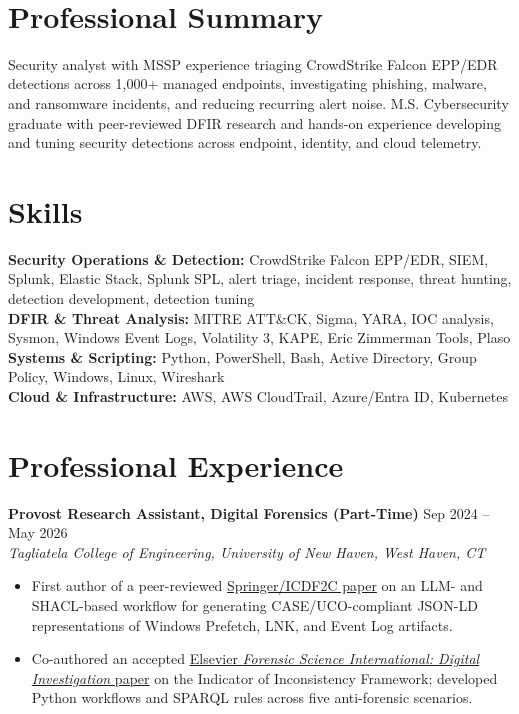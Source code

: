 \documentclass{resume2}
\makeatletter
\renewcommand{\makeheader}{%
  \begin{center}
    {\Large\bfseries \@name}\\[-2pt]
    {\small \@contact}
  \end{center}
}
\makeatother
\begin{document}
\raggedright
\fontsize{10.5pt}{13.2pt}\selectfont
\makeheader

\section{Professional Summary}
Security analyst with MSSP experience triaging CrowdStrike Falcon EPP/EDR detections across 1,000+ managed endpoints, investigating phishing, malware, and ransomware incidents, and reducing recurring alert noise. M.S. Cybersecurity graduate with peer-reviewed DFIR research and hands-on experience developing and tuning security detections across endpoint, identity, and cloud telemetry.

\section{Skills}
\textbf{Security Operations \& Detection:} CrowdStrike Falcon EPP/EDR, SIEM, Splunk, Elastic Stack, Splunk SPL, alert triage, incident response, threat hunting, detection development, detection tuning\\
\textbf{DFIR \& Threat Analysis:} MITRE ATT\&CK, Sigma, YARA, IOC analysis, Sysmon, Windows Event Logs, Volatility 3, KAPE, Eric Zimmerman Tools, Plaso\\
\textbf{Systems \& Scripting:} Python, PowerShell, Bash, Active Directory, Group Policy, Windows, Linux, Wireshark\\
\textbf{Cloud \& Infrastructure:} AWS, AWS CloudTrail, Azure/Entra ID, Kubernetes

\section{Professional Experience}
\textbf{Provost Research Assistant, Digital Forensics (Part-Time)} \hfill Sep 2024 -- May 2026\\
\textit{Tagliatela College of Engineering, University of New Haven, West Haven, CT}
\begin{itemize}
  \item First author of a peer-reviewed \href{https://doi.org/10.1007/978-3-032-22542-9_23}{Springer/ICDF2C paper} on an LLM- and SHACL-based workflow for generating CASE/UCO-compliant JSON-LD representations of Windows Prefetch, LNK, and Event Log artifacts.
  \item Co-authored an accepted \href{https://doi.org/10.1016/j.fsidi.2026.302148}{Elsevier \textit{Forensic Science International: Digital Investigation} paper} on the Indicator of Inconsistency Framework; developed Python workflows and SPARQL rules across five anti-forensic scenarios.
\end{itemize}
\end{document}

